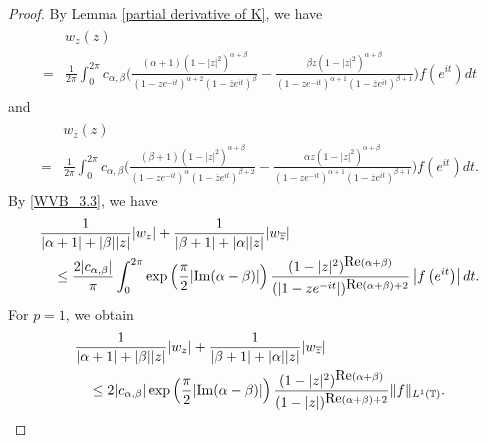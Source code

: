 \documentclass[11pt, reqno]{amsart}
\theoremstyle{definition}
\numberwithin{equation}{section}
\newcommand{\abs}[1]{\left\vert#1\right\vert}
\theoremstyle{remark}
\numberwithin{equation}{section}
\begin{document}
\begin{proof}
	By Lemma \ref{partial derivative of K}, we have 
   \begin{align*}
   \begin{split}
       &w_z(z)\\=&\frac{1}{2\pi} \int_0^{2\pi} c_{\alpha,\beta} \bigg(\frac{(\alpha + 1)(1-|z|^2)^{\alpha+\beta}}{(1-ze^{-it})^{\alpha+2}(1-\overline{z}e^{it})^\beta} - \frac{\beta z (1-|z|^2)^{\alpha+\beta}}{(1-ze^{-it})^{\alpha+1}(1-\overline{z}e^{it})^{\beta+1}}\bigg) f\left(e^{it}\right) dt
       \end{split}
       \end{align*} 
       and \begin{align*}
   \begin{split}&w_{\overline{z}}(z)\\=&\frac{1}{2\pi} \int_0^{2\pi} c_{\alpha,\beta} \bigg(\frac{(\beta + 1)(1-|z|^2)^{\alpha+\beta}}{(1-ze^{-it})^{\alpha}(1-\overline{z}e^{it})^{\beta+2}} - \frac{\alpha z (1-|z|^2)^{\alpha+\beta}}{(1-ze^{-it})^{\alpha+1}(1-\overline{z}e^{it})^{\beta+1}}\bigg) f\left(e^{it}\right) dt.\end{split}
       \end{align*} By \eqref{WVB_3.3}, we have
	\begin{align}
    \begin{split}
    \label{bound_|w_z|+|w_bar{z}|}
		&\frac{1}{|\alpha+1|+|\beta||z|}|w_z|+\frac{1}{|\beta+1|+|\alpha||z|}|w_{\overline{z}}|\\& \quad\leq \frac{2|c_{\alpha,\beta}|}{\pi}\int_0^{2\pi} \exp\left(\frac{\pi}{2}|\mbox{\rm Im}(\alpha- \beta)|\right)\dfrac{(1-|z|^2)^{\mbox{\rm Re}(\alpha+\beta)}}{(|1-ze^{-it}|)^{\mbox{\rm Re}(\alpha+\beta)+2}}\abs{f\left(e^{it}\right)}dt.
	\end{split}
    \end{align}
	For $p=1$, we obtain
	\begin{align}
    \begin{split}
		&\frac{1}{|\alpha+1|+|\beta||z|}|w_z|+\frac{1}{|\beta+1|+|\alpha||z|}|w_{\overline{z}}|\\& \quad\leq  2|c_{\alpha,\beta}|\exp\left(\frac{\pi}{2}|\mbox{\rm Im}(\alpha- \beta)|\right)\dfrac{(1-|z|^2)^{\mbox{\rm Re}(\alpha+\beta)}}{(1-|z|)^{\mbox{\rm Re}(\alpha+\beta)+2}}\|f\|_{L^1(\mathbb{T})}.
	\end{split}

\end{align}
\end{proof}
\end{document}

